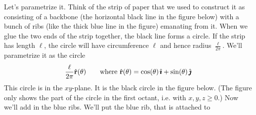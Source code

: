 \begin{eg}
Let's parametrize it. Think of the strip of paper that we used to construct 
it as consisting of a backbone (the horizontal black line in the figure below) 
with a bunch of ribs (like the thick blue line in the figure) emanating from it.
When we glue the two  ends of the strip together, the black line forms
a circle. If the strip has length $\ell$, the circle will have circumference $\ell$ and hence radius $\frac{\ell}{2\pi}$. We'll parametrize it as 
the circle
\begin{align*}
\frac{\ell}{2\pi}\hat{\mathbf{r}}(\theta)
\qquad\text{where } \hat{\mathbf{r}}(\theta) = \cos(\theta)\,\hat{\pmb{\imath}} + \sin(\theta)\,\hat{\pmb{\jmath}} 
\end{align*}
This circle is in the $xy$-plane. It is the black circle in the 
figure below. (The figure only shows the part of the circle 
in the first octant, i.e. with $x,y,z\ge 0$.)
Now we'll add in the blue ribs. We'll put the blue rib, that is attached to 

\end{eg}
